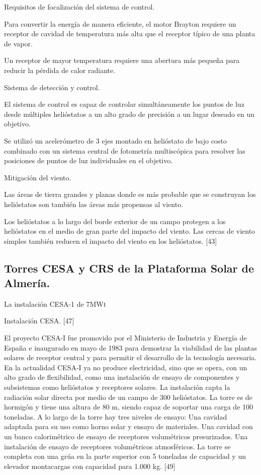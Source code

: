 \documentclass[12pt]{article}
\begin{document}
Requisitos de focalización del sistema de control.

Para convertir la energía de manera eficiente, el motor Brayton requiere un receptor de cavidad de temperatura más alta que el receptor típico de una planta de vapor.

Un receptor de mayor temperatura requiere una abertura más pequeña para reducir la pérdida de calor radiante.

Sistema de detección y control.

El sistema de control es capaz de controlar simultáneamente los puntos de luz desde múltiples helióstatos a un alto grado de precisión a un lugar deseado en un objetivo.

Se utilizó un acelerómetro de 3 ejes montado en helióstato de bajo costo combinado con un sistema central de fotometría multiscópica para resolver las posiciones de puntos de luz individuales en el objetivo.

Mitigación del viento.

Las áreas de tierra grandes y planas donde es más probable que se construyan los helióstatos son también las áreas más propensas al viento.

Los helióstatos a lo largo del borde exterior de un campo protegen a los helióstatos en el medio de gran parte del impacto del viento. Las cercas de viento simples también reducen el impacto del viento en los helióstatos. [43]



\subsection{Torres CESA y CRS de la Plataforma Solar de Almería.}

La instalación CESA-1 de 7MWt


Instalación CESA. [47]

El proyecto CESA-I fue promovido por el Ministerio de Industria y Energía de España e inaugurado en mayo de 1983 para demostrar la viabilidad de las plantas solares de receptor central y para permitir el desarrollo de la tecnología necesaria. En la actualidad CESA-I ya no produce electricidad, sino que se opera, con un alto grado de flexibilidad, como una instalación de ensayo de componentes y subsistemas como helióstatos y receptores solares.
La instalación capta la radiación solar directa por medio de un campo de 300 helióstatos.
La torre es de hormigón y tiene una altura de 80 m, siendo capaz de soportar una carga de 100 toneladas. A lo largo de la torre hay tres niveles de ensayo:
Una cavidad adaptada para su uso como horno solar y ensayo de materiales.
Una cavidad con un banco calorimétrico de ensayo de receptores volumétricos presurizados.
Una instalación de ensayo de receptores volumétricos atmosféricos.
La torre se completa con una grúa en la parte superior con 5 toneladas de capacidad y un elevador montacargas con capacidad para 1.000 kg. [49]
\end{document}
